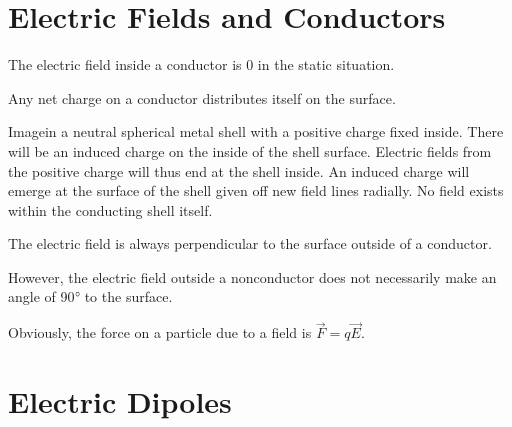 \section{Electric Fields and Conductors}

\begin{remark}
    The electric field inside a conductor is 0 in the static situation.

    Any net charge on a conductor distributes itself on the surface.
\end{remark}
\begin{remark}
    Imagein a neutral spherical metal shell with a positive charge fixed inside. There will be an induced charge on the inside of the shell surface. Electric fields from the positive charge will thus end at the shell inside. An induced charge will emerge at the surface of the shell given off new field lines radially. No field exists within the conducting shell itself.
\end{remark}
\begin{remark}
    The electric field is always perpendicular to the surface outside of a conductor.

    However, the electric field outside a nonconductor does not necessarily make an angle of 90$\operatorname{^{\circ}\!}$ to the surface.
\end{remark}
\begin{remark}
    Obviously, the force on a particle due to a field is $\vec{F} = q\vec{E}$.
\end{remark}

\section{Electric Dipoles}

